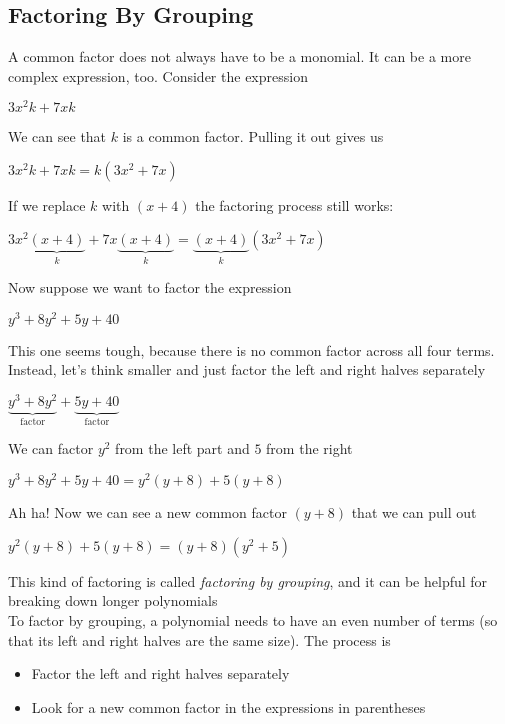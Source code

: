 \documentclass{ximera}
\begin{document}
\subsection{Factoring By Grouping}
A common factor does not always have to be a monomial. It can be a more complex expression, too. Consider the expression
\begin{center}$3x^{2}k+7xk$\end{center}
We can see that $k$ is a common factor. Pulling it out gives us
\begin{center}$3x^{2}k+7xk=k\left(3x^{2}+7x\right)$\end{center}
If we replace $k$ with $(x+4)$ the factoring process still works:
\begin{center}$3x^{2}\underbrace{(x+4)}_{k}+7x\underbrace{(x+4)}_{k}=\underbrace{(x+4)}_{k}\left(3x^{2}+7x\right)$\end{center}
Now suppose we want to factor the expression
\begin{center}$y^{3}+8y^{2}+5y+40$\end{center}
This one seems tough, because there is no common factor across all four terms. Instead, let's think smaller and just factor the left and right halves separately
\begin{center}$\underbrace{y^{3}+8y^{2}}_{\text{factor}}+\underbrace{5y+40}_{\text{factor}}$\end{center}
We can factor $y^{2}$ from the left part and $5$ from the right
\begin{center}$y^{3}+8y^{2}+5y+40=y^{2}(y+8)+5(y+8)$\end{center}
Ah ha! Now we can see a new common factor $(y+8)$ that we can pull out
\begin{center}$y^{2}(y+8)+5(y+8)=(y+8)(y^{2}+5)$\end{center}
This kind of factoring is called \emph{factoring by grouping}, and it can be helpful for breaking down longer polynomials\\
To factor by grouping, a polynomial needs to have an even number of terms (so that its left and right halves are the same size). The process is
\begin{itemize}
	\item Factor the left and right halves separately
	\item Look for a new common factor in the expressions in parentheses
\end{itemize}
\end{document}
